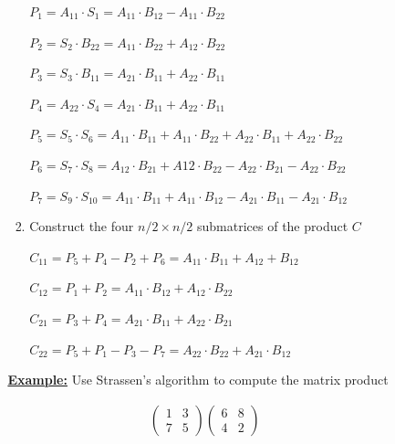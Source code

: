 \documentclass[12pt]{article}
\begin{document}
\begin{enumerate}[1.]
\begin{itemize}
\begin{itemize}
\begin{enumerate}[1)]
                \bigskip

                $P_1 = A_{11} \cdot S_1 = A_{11} \cdot B_{12} - A_{11} \cdot B_{22}$

                $P_2 = S_2 \cdot B_{22} = A_{11} \cdot B_{22} + A_{12} \cdot B_{22}$

                $P_3 = S_3 \cdot B_{11} = A_{21} \cdot B_{11} + A_{22} \cdot B_{11}$

                $P_4 = A_{22} \cdot S_4 = A_{21} \cdot B_{11} + A_{22} \cdot B_{11}$

                $P_5 = S_5 \cdot S_6 = A_{11} \cdot B_{11} + A_{11} \cdot B_{22} + A_{22} \cdot B_{11} + A_{22} \cdot B_{22}$

                $P_6 = S_7 \cdot S_8 = A_{12} \cdot B_{21} + A{12} \cdot B_{22} - A_{22} \cdot B_{21} - A_{22} \cdot B_{22}$

                $P_7 = S_9 \cdot S_{10} = A_{11} \cdot B_{11} + A_{11} \cdot B_{12} - A_{21} \cdot B_{11} - A_{21} \cdot B_{12}$

                \item Construct the four $n/2 \times n/2$ submatrices of the product $C$

                \bigskip

                $C_{11} = P_5 + P_4 - P_2 + P_6 = A_{11} \cdot B_{11} + A_{12} + B_{12}$

                $C_{12} = P_1 + P_2 = A_{11} \cdot B_{12} + A_{12} \cdot B_{22}$

                $C_{21} = P_3 + P_4 = A_21\cdot B_11 + A_{22} \cdot B_{21}$

                $C_{22} = P_5 + P_1 - P_3 - P_7 = A_{22} \cdot B_{22} + A_{21} \cdot B_{12}$

            \end{enumerate}

            \bigskip

            \underline{\textbf{Example:}} Use Strassen's algorithm to compute the matrix product

            \begin{align*}
            \begin{pmatrix}
                1 & 3\\
                7 & 5
            \end{pmatrix}
            \begin{pmatrix}
                6 & 8\\
                4 & 2
            \end{pmatrix}
            \end{align*}


\end{itemize}
\end{itemize}
\end{enumerate}
\end{document}
